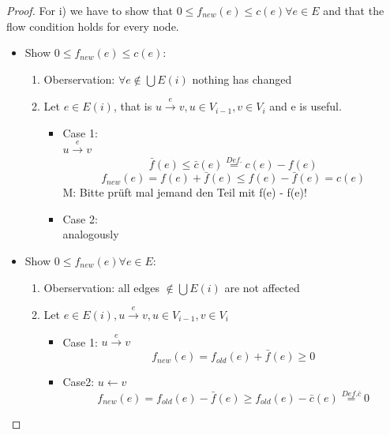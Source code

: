 \begin{proof}
For i) we have to show that $0 \le f_{new}(e) \le c(e) \forall e \in E$ and that the flow condition holds for every node. \\
\begin{itemize}
\item Show $0 \le f_{new}(e) \le c(e)$:
\begin{enumerate}
\item Oberservation: $\forall e \notin \bigcup E(i)$ nothing has changed 
\item Let $e \in E(i)$, that is $u \xrightarrow{e} v, u \in V_{i-1}, v \in V_i$ and e is useful. 
\begin{itemize}
\item Case 1: \\ $u \xrightarrow{e} v$ \\ 
\[ \bar{f}(e) \le \bar{c}(e) \overset{Def.}{=} c(e) -f(e) \] 
\[ f_{new}(e) = f(e) + \bar{f}(e) \le f(e) - \bar{f}(e) = c(e) \] M: Bitte prüft mal jemand den Teil mit f(e) - f(e)! 
\item Case 2: \\ analogously
\end{itemize}
\end{enumerate}
\item Show $0 \le f_{new}(e) \forall e \in E$:
\begin{enumerate}
\item Oberservation: all edges $\notin \bigcup E(i)$ are not affected
\item Let $e \in E(i), u \xrightarrow{e} v, u \in V_{i-1}, v \in V_i$ \\
\begin{itemize}
\item Case 1: $u \xrightarrow{e} v$  
\[ f_{new}(e) = f_{old}(e) + \bar{f}(e) \geq 0 \]
\item Case2: $u \xleftarrow{ } v$
\[ f_{new}(e) = f_{old}(e) - \bar{f}(e) \geq f_{old}(e) - \bar{c}(e) \overset{Def. \bar{c}}{=} 0 \]
\end{itemize}
\end{enumerate}
\end{itemize}


\end{proof}
